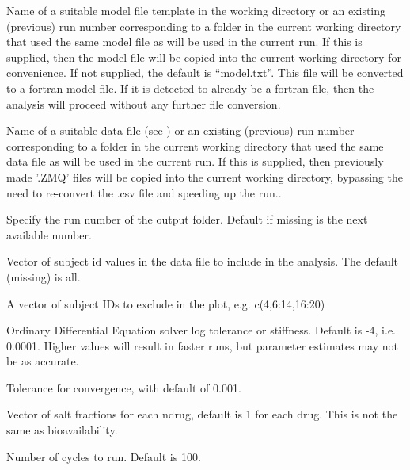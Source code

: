 \documentclass[a4paper]{book}
\begin{document}
%
\begin{Arguments}
\begin{ldescription}
\item[\code{model}] Name of a suitable model file template in the working directory or
an existing (previous) run number corresponding to a folder in the current working directory that used the same model file as will be used in the current run.
If this is supplied, then the model file will be copied into the current 
working directory for convenience.  If not supplied, 
the default is ``model.txt''.  This file will be converted to a fortran model file.
If it is detected to already be a fortran file, then the analysis will proceed without any further
file conversion.

\item[\code{data}] Name of a suitable data file (see ) or
an existing (previous) run number corresponding to a folder in the current working directory that used the same data file as will be used in the current run.
If this is supplied, then previously made  '.ZMQ' files will be copied into the current 
working directory, bypassing the need to re-convert the .csv file and speeding up the run..

\item[\code{run}] Specify the run number of the output folder.  Default if missing is the next available number.

\item[\code{include}] Vector of subject id values in the data file to include in the analysis.  The default (missing) is all.

\item[\code{exclude}] A vector of subject IDs to exclude in the plot, e.g. c(4,6:14,16:20)

\item[\code{ode}] Ordinary Differential Equation solver log tolerance or stiffness.  Default is -4, i.e. 0.0001.  Higher values will result in faster
runs, but parameter estimates may not be as accurate.

\item[\code{tol}] Tolerance for convergence, with default of 0.001.

\item[\code{salt}] Vector of salt fractions for each ndrug, default is 1 for each drug.  This is not the same as bioavailability.

\item[\code{cycles}] Number of cycles to run. Default is 100.


\end{ldescription}
\end{Arguments}
\end{document}
